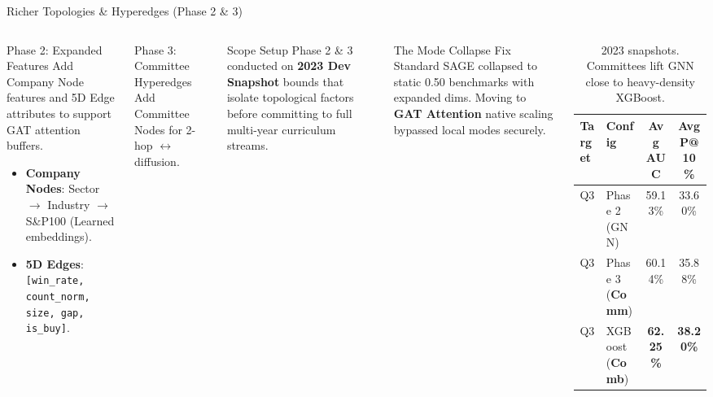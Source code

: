\documentclass[aspectratio=169,11pt]{beamer}
\begin{document}
\begin{frame}{Richer Topologies \& Hyperedges (Phase 2 \& 3)}
  \begin{columns}[T]
      \begin{block}{Phase 2: Expanded Features}
        \footnotesize
        Add Company Node features and 5D Edge attributes to support GAT attention buffers.
        \begin{itemize}
          \item \textbf{Company Nodes}: Sector $\rightarrow$ Industry $\rightarrow$ S\&P100 (Learned embeddings).
          \item \textbf{5D Edges}: \texttt{[win\_rate, count\_norm, size, gap, is\_buy]}.
        \end{itemize}
      \end{block}

      \begin{block}{Phase 3: Committee Hyperedges}
        \footnotesize
        Add Committee Nodes for 2-hop  $\leftrightarrow$  diffusion.
      \end{block}

      \begin{alertblock}{Scope Setup}
        \tiny
        Phase 2 \& 3 conducted on \textbf{2023 Dev Snapshot} bounds that isolate topological factors before committing to full multi-year curriculum streams.
      \end{alertblock}

      \begin{alertblock}{The Mode Collapse Fix}
        \footnotesize
        Standard SAGE collapsed to static 0.50 benchmarks with expanded dims. Moving to \textbf{GAT Attention} native scaling bypassed local modes securely.
      \end{alertblock}

      \begin{table}
        \tiny
        \begin{tabular}{llcc}
          \toprule
          \textbf{Target} & \textbf{Config} & \textbf{Avg AUC} & \textbf{Avg P@10\%} \\
          \midrule
          Q3 & Phase 2 (GNN) & 59.13\% & 33.60\% \\
          Q3 & Phase 3 (\textbf{Comm}) & 60.14\% & 35.88\% \\
          \midrule
          Q3 & XGBoost (\textbf{Comb}) & \textbf{62.25\%} & \textbf{38.20\%} \\
          \bottomrule
        \end{tabular}
        \caption{\tiny 2023 snapshots. Committees lift GNN close to heavy-density XGBoost.}
      \end{table}
  \end{columns}
\end{frame}
\end{document}
